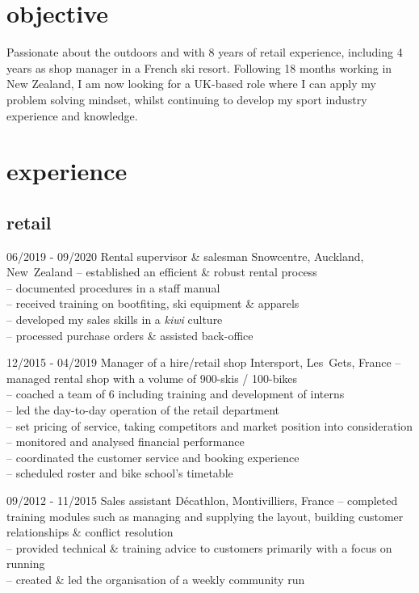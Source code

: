 \documentclass[a4paper]{farangoth-cv}
\begin{document}
\vspace{2.2\parskip}
\section{objective}
Passionate about the outdoors and with 8 years of retail experience, including 4 years as shop manager in a French ski resort. Following 18 months working in New Zealand, I am now looking for a UK-based role where I can apply my problem solving mindset, whilst continuing to develop my sport industry experience and knowledge.

\section{experience}
\subsection{retail}
\begin{entrylist}
  \entry%
  {06/2019 \-- 09/2020}
  {Rental supervisor \& salesman}
  {Snowcentre, \mbox{Auckland}, \mbox{New Zealand}}
  {
    \--- established an efficient \& robust rental process\\
    \--- documented  procedures in a staff manual\\
    \--- received training on bootfiting, ski equipment \& apparels\\
    \--- developed my sales skills in a \emph{kiwi} culture\\
    \--- processed purchase orders \& assisted back-office
  }

  \entry%
  {12/2015 \-- 04/2019}
  {Manager of a hire/retail shop}
  {Intersport, \mbox{Les Gets}, \mbox{France}}
  {
    \--- managed rental shop with a volume of 900-skis / 100-bikes\\
    \--- coached a team of 6 including training and development of interns\\
    \--- led the day-to-day operation of the retail department\\
    \--- set pricing of service, taking competitors and market position into consideration\\
    \--- monitored and analysed financial performance\\
    \--- coordinated the customer service and booking experience\\
    \--- scheduled roster and bike school's timetable
  }

  \entry%
  {09/2012 \-- 11/2015}
  {Sales assistant}
  {Décathlon, \mbox{Montivilliers}, \mbox{France}}
  {%
    \--- completed training modules such as managing and supplying the layout, building customer relationships \& conflict resolution\\
    \--- provided technical \& training advice to customers primarily with a focus on running\\
    \--- created \& led the organisation of a weekly community run
  }
\end{entrylist}
\end{document}
